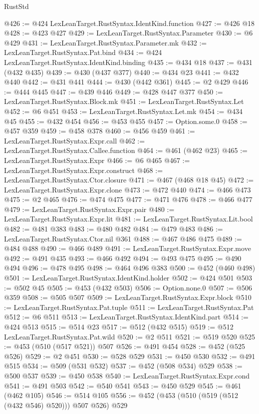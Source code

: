 \begin{lexlean}{RustStd}
\begin{coremodule}
@426 := @424 LexLeanTarget.RustSyntax.IdentKind.function
@427 := @426 @18
@428 := @423 @427
@429 := LexLeanTarget.RustSyntax.Parameter
@430 := @6 @429
@431 := LexLeanTarget.RustSyntax.Parameter.mk
@432 := LexLeanTarget.RustSyntax.Pat.bind
@434 := @424 LexLeanTarget.RustSyntax.IdentKind.binding
@435 := @434 @18
@437 := @431 (@432 @435)
@439 := @430 (@437 @377)
@440 := @434 @23
@441 := @432 @440
@442 := @431 @441
@444 := @430 (@442 @361)
@445 := @2 @429
@446 := @444 @445
@447 := @439 @446
@449 := @428 @447 @377
@450 := LexLeanTarget.RustSyntax.Block.mk
@451 := LexLeanTarget.RustSyntax.Let
@452 := @6 @451
@453 := LexLeanTarget.RustSyntax.Let.mk
@454 := @434 @45
@455 := @432 @454
@456 := @453 @455
@457 := Option.some.{0}
@458 := @457 @359
@459 := @458 @378
@460 := @456 @459
@461 := LexLeanTarget.RustSyntax.Expr.call
@462 := LexLeanTarget.RustSyntax.Callee.function
@464 := @461 (@462 @23)
@465 := LexLeanTarget.RustSyntax.Expr
@466 := @6 @465
@467 := LexLeanTarget.RustSyntax.Expr.construct
@468 := LexLeanTarget.RustSyntax.Ctor.closure
@471 := @467 (@468 @18 @45)
@472 := LexLeanTarget.RustSyntax.Expr.clone
@473 := @472 @440
@474 := @466 @473
@475 := @2 @465
@476 := @474 @475
@477 := @471 @476
@478 := @466 @477
@479 := LexLeanTarget.RustSyntax.Expr.pair
@480 := LexLeanTarget.RustSyntax.Expr.lit
@481 := LexLeanTarget.RustSyntax.Lit.bool
@482 := @481 @383
@483 := @480 @482
@484 := @479 @483
@486 := LexLeanTarget.RustSyntax.Ctor.nil @361
@488 := @467 @486 @475
@489 := @484 @488
@490 := @466 @489
@491 := LexLeanTarget.RustSyntax.Expr.move
@492 := @491 @435
@493 := @466 @492
@494 := @493 @475
@495 := @490 @494
@496 := @478 @495
@498 := @464 @496 @383
@500 := @452 (@460 @498)
@501 := LexLeanTarget.RustSyntax.IdentKind.holder
@502 := @424 @501
@503 := @502 @45
@505 := @453 (@432 @503)
@506 := Option.none.{0}
@507 := @506 @359
@508 := @505 @507
@509 := LexLeanTarget.RustSyntax.Expr.block
@510 := LexLeanTarget.RustSyntax.Pat.tuple
@511 := LexLeanTarget.RustSyntax.Pat
@512 := @6 @511
@513 := LexLeanTarget.RustSyntax.IdentKind.part
@514 := @424 @513
@515 := @514 @23
@517 := @512 (@432 @515)
@519 := @512 LexLeanTarget.RustSyntax.Pat.wild
@520 := @2 @511
@521 := @519 @520
@525 := @453 (@510 (@517 @521)) @507
@526 := @491 @454
@528 := @452 (@525 @526)
@529 := @2 @451
@530 := @528 @529
@531 := @450 @530
@532 := @491 @515
@534 := @509 (@531 @532)
@537 := @452 (@508 @534) @529
@538 := @500 @537
@539 := @450 @538
@540 := LexLeanTarget.RustSyntax.Expr.cond
@541 := @491 @503
@542 := @540 @541
@543 := @450 @529
@545 := @461 (@462 @105)
@546 := @514 @105
@556 := @452 (@453 (@510 (@519 (@512 (@432 @546) @520))) @507 @526) @529

\end{coremodule}
\end{lexlean}
